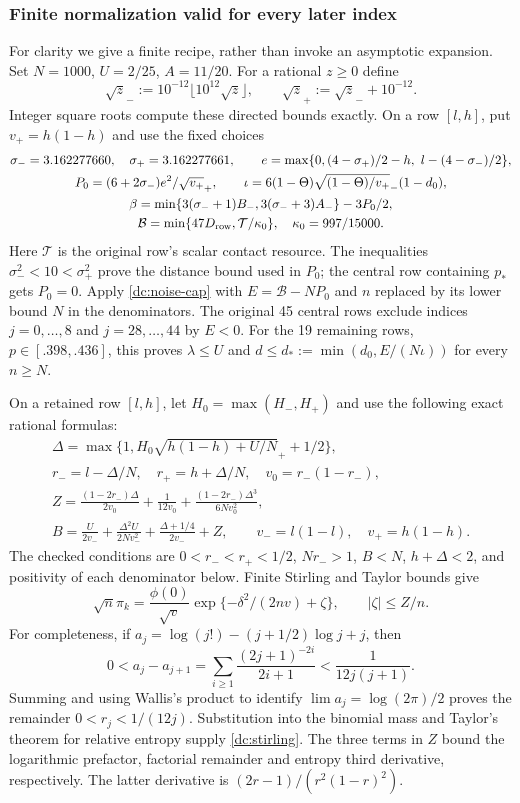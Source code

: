 \subsubsection{Finite normalization valid for every later index}
\label{dc:tail-normalization}
For clarity we give a finite recipe, rather than invoke an asymptotic
expansion. Set $N=1000$, $U=2/25$, $A=11/20$.
For a rational $z\ge0$ define
\[
 \sqrt z_-:=10^{-12}\lfloor10^{12}\sqrt z\rfloor,
 \qquad \sqrt z_+:=\sqrt z_-+10^{-12}.
\]
Integer square roots compute these directed bounds exactly. On a row
$[l,h]$, put $v_+=h(1-h)$ and use the fixed choices
\begin{gather*}
 \sigma_-=3.162277660,\quad\sigma_+=3.162277661,\qquad
 e=\max\{0,(4-\sigma_+)/2-h,\ l-(4-\sigma_-)/2\},\\
 P_0=(6+2\sigma_-)e^2/\sqrt{v_+}_+,\qquad
 \iota=6(1-\Theta)\sqrt{(1-\Theta)/v_+}_-(1-d_0),\\
 \beta=\min\{3(\sigma_-+1)B_-,3(\sigma_-+3)A_-\}-3P_0/2,\\
 \mathcal B=\min\{47D_{\rm row},\mathcal T/\kappa_0\},\quad
 \kappa_0=997/15000.
\end{gather*}
Here $\mathcal T$ is the original row's scalar contact resource. The
inequalities $\sigma_-^2<10<\sigma_+^2$ prove the distance bound used
in $P_0$; the central row containing $p_*$ gets $P_0=0$.
Apply \eqref{dc:noise-cap} with
$E=\mathcal B-NP_0$ and $n$ replaced by its lower bound $N$ in the
denominators. The original 45 central rows exclude indices
$j=0,\ldots,8$ and $j=28,\ldots,44$ by $E<0$.
For the 19 remaining rows, $p\in[.398,.436]$, this proves
$\lambda\le U$ and $d\le d_*:=\min(d_0,E/(N\iota))$ for every $n\ge N$.

On a retained row $[l,h]$, let $H_0=\max(H_-,H_+)$ and use
the following exact rational formulas:
\begin{gather*}
 \Delta=\max\{1,H_0\sqrt{h(1-h)+U/N}_++1/2\},\\
 r_-=l-\Delta/N,\quad r_+=h+\Delta/N,\quad v_0=r_-(1-r_-),\\
 Z=\frac{(1-2r_-)\Delta}{2v_0}+\frac1{12v_0}
                  +\frac{(1-2r_-)\Delta^3}{6Nv_0^2},\\
 B=\frac{U}{2v_-}+\frac{\Delta^2U}{2Nv_-^2}
                         +\frac{\Delta+1/4}{2v_-}+Z,
 \qquad v_-=l(1-l),\quad v_+=h(1-h).
\end{gather*}
The checked conditions are $0<r_-<r_+<1/2$, $Nr_->1$, $B<N$,
$h+\Delta<2$, and positivity of each denominator below. Finite Stirling
and Taylor bounds give
\begin{equation}\label{dc:stirling}
 \sqrt n\pi_k=\frac{\phi(0)}{\sqrt v}
    \exp\{-\delta^2/(2nv)+\zeta\},\qquad |\zeta|\le Z/n.
\end{equation}
For completeness, if $a_j=\log(j!)-(j+1/2)\log j+j$, then
\[
 0<a_j-a_{j+1}=\sum_{i\ge1}\frac{(2j+1)^{-2i}}{2i+1}
                       <\frac1{12j(j+1)}.
\]
Summing and using Wallis's product to identify
$\lim a_j=\log(2\pi)/2$ proves the remainder $0<r_j<1/(12j)$.
Substitution into the binomial mass and Taylor's theorem for relative
entropy supply \eqref{dc:stirling}. The three terms in $Z$ bound the
logarithmic prefactor, factorial remainder and entropy third derivative,
respectively. The latter derivative is $(2r-1)/(r^2(1-r)^2)$.

